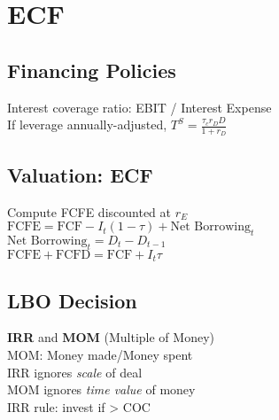 \section{ECF}
	\subsection*{Financing Policies}
	Interest coverage ratio: EBIT / Interest Expense\\
	If leverage annually-adjusted, $T^{S} = \frac{\tau_{c}r_{D}D}{1 + r_{D}}$
	
	\subsection*{Valuation: ECF}
	Compute FCFE discounted at $r_{E}$\\
	$\text{FCFE} = \text{FCF} - I_{t}\left(1 - \tau\right) + \text{Net Borrowing}_{t}$\\
	$\text{Net Borrowing}_{t} = D_{t} - D_{t - 1}$\\
	$\text{FCFE} + \text{FCFD} = \text{FCF} + I_{t}\tau$
	
	\subsection*{LBO Decision}
	\textbf{IRR} and \textbf{MOM} (Multiple of Money)\\
	MOM: Money made/Money spent\\
	IRR ignores \emph{scale} of deal\\
	MOM ignores \emph{time value} of money\\
	IRR rule: invest if > COC
	